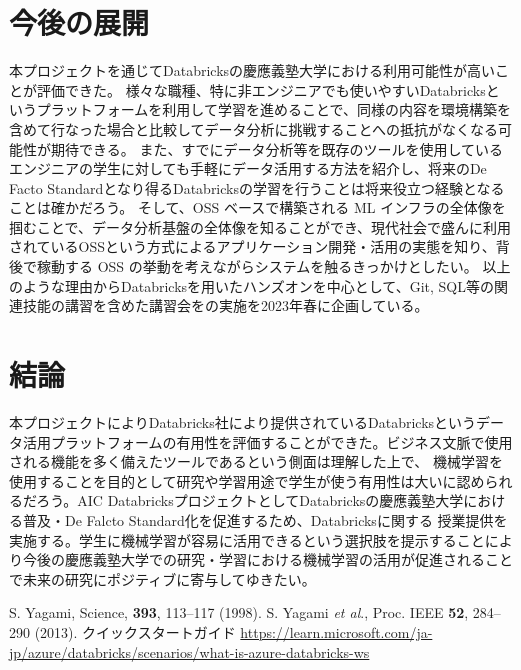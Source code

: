 \documentclass[twocolumn]{jsarticle}
\begin{document}
\section{今後の展開}
本プロジェクトを通じてDatabricksの慶應義塾大学における利用可能性が高いことが評価できた。
様々な職種、特に非エンジニアでも使いやすいDatabricksというプラットフォームを利用して学習を進めることで、同様の内容を環境構築を含めて行なった場合と比較してデータ分析に挑戦することへの抵抗がなくなる可能性が期待できる。
また、すでにデータ分析等を既存のツールを使用しているエンジニアの学生に対しても手軽にデータ活用する方法を紹介し、将来のDe Facto Standardとなり得るDatabricksの学習を行うことは将来役立つ経験となることは確かだろう。
そして、OSS ベースで構築される ML インフラの全体像を掴むことで、データ分析基盤の全体像を知ることができ、現代社会で盛んに利用されているOSSという方式によるアプリケーション開発・活用の実態を知り、背後で稼動する OSS の挙動を考えながらシステムを触るきっかけとしたい。
以上のような理由からDatabricksを用いたハンズオンを中心として、Git, SQL等の関連技能の講習を含めた講習会をの実施を2023年春に企画している。
\section{結論}
本プロジェクトによりDatabricks社により提供されているDatabricksというデータ活用プラットフォームの有用性を評価することができた。ビジネス文脈で使用される機能を多く備えたツールであるという側面は理解した上で、
機械学習を使用することを目的として研究や学習用途で学生が使う有用性は大いに認められるだろう。AIC DatabricksプロジェクトとしてDatabricksの慶應義塾大学における普及・De Falcto Standard化を促進するため、Databricksに関する
授業提供を実施する。学生に機械学習が容易に活用できるという選択肢を提示することにより今後の慶應義塾大学での研究・学習における機械学習の活用が促進されることで未来の研究にポジティブに寄与してゆきたい。

\begin{thebibliography}{9}
   S. Yagami, Science, \textbf{393}, 113--117 (1998).
   S. Yagami \textit{et al}., Proc. IEEE \textbf{52}, 284--290 (2013).
    クイックスタートガイド
   \url{https://learn.microsoft.com/ja-jp/azure/databricks/scenarios/what-is-azure-databricks-ws}
  \bibitem{}
  \end{thebibliography}
\end{document}
